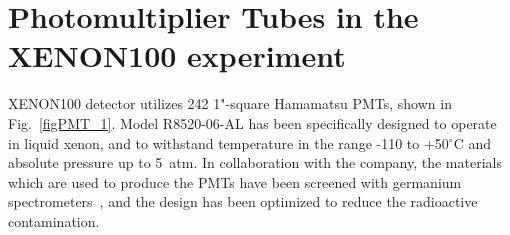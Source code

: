 \section{Photomultiplier Tubes in the XENON100 experiment}
\label{secPMT}


XENON100 detector utilizes 242 1"-square Hamamatsu PMTs, shown in Fig.~\ref{figPMT_1}. Model R8520-06-AL has been specifically designed to operate in liquid xenon, and to withstand temperature in the range -110 to +50$^{\circ}$C and absolute pressure up to 5~atm. In collaboration with the company, the materials which are used to produce the PMTs have been screened with germanium spectrometers~\cite{ScreeningPaper}, and the design has been optimized to reduce the radioactive contamination.

